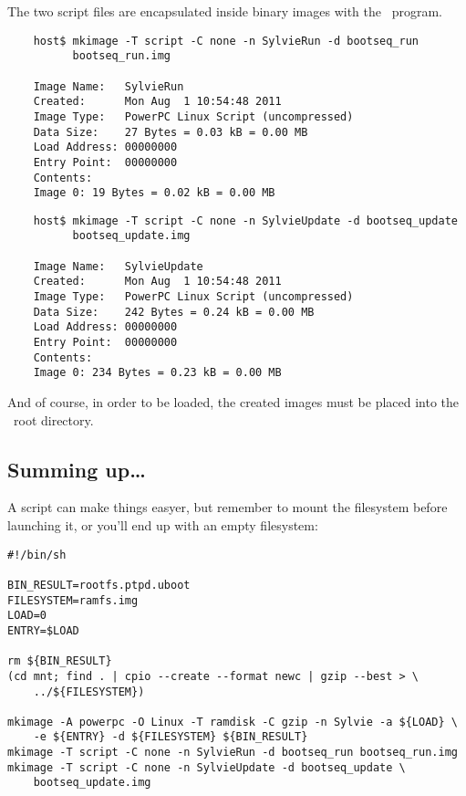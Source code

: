         The two script files are encapsulated inside binary images with
        the \mkimage\ program.
\begin{lstlisting}
    host$ mkimage -T script -C none -n SylvieRun -d bootseq_run
          bootseq_run.img

    Image Name:   SylvieRun
    Created:      Mon Aug  1 10:54:48 2011
    Image Type:   PowerPC Linux Script (uncompressed)
    Data Size:    27 Bytes = 0.03 kB = 0.00 MB
    Load Address: 00000000
    Entry Point:  00000000
    Contents:
    Image 0: 19 Bytes = 0.02 kB = 0.00 MB
\end{lstlisting}

\begin{lstlisting}
    host$ mkimage -T script -C none -n SylvieUpdate -d bootseq_update
          bootseq_update.img

    Image Name:   SylvieUpdate
    Created:      Mon Aug  1 10:54:48 2011
    Image Type:   PowerPC Linux Script (uncompressed)
    Data Size:    242 Bytes = 0.24 kB = 0.00 MB
    Load Address: 00000000
    Entry Point:  00000000
    Contents:
    Image 0: 234 Bytes = 0.23 kB = 0.00 MB
\end{lstlisting}

        And of course, in order to be loaded, the created images must be
        placed into the \TFTP\ root directory.

\subsection{Summing up\dots}

    A script can make things easyer, but remember to mount the filesystem
    before launching it, or you'll end up with an empty filesystem:
\begin{lstlisting}
#!/bin/sh

BIN_RESULT=rootfs.ptpd.uboot
FILESYSTEM=ramfs.img
LOAD=0
ENTRY=$LOAD

rm ${BIN_RESULT}
(cd mnt; find . | cpio --create --format newc | gzip --best > \
    ../${FILESYSTEM})

mkimage -A powerpc -O Linux -T ramdisk -C gzip -n Sylvie -a ${LOAD} \
    -e ${ENTRY} -d ${FILESYSTEM} ${BIN_RESULT}
mkimage -T script -C none -n SylvieRun -d bootseq_run bootseq_run.img
mkimage -T script -C none -n SylvieUpdate -d bootseq_update \
    bootseq_update.img
\end{lstlisting}

